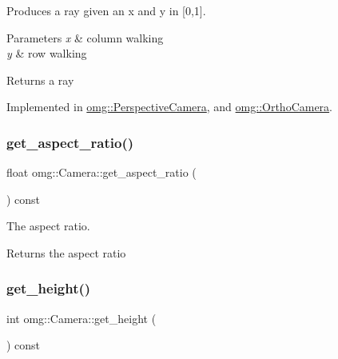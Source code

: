 Produces a ray given an x and y in \mbox{[}0,1\mbox{]}. 


\begin{DoxyParams}{Parameters}
{\em x} & column walking \\
\hline
{\em y} & row walking \\
\hline
\end{DoxyParams}
\begin{DoxyReturn}{Returns}
a ray 
\end{DoxyReturn}


Implemented in \mbox{\hyperlink{classomg_1_1_perspective_camera_a6d849c2b0768f12aed7b50d3ce87afeb}{omg\+::\+Perspective\+Camera}}, and \mbox{\hyperlink{classomg_1_1_ortho_camera_af5dba96ad9cdf91121093d0c9d72e57f}{omg\+::\+Ortho\+Camera}}.

\mbox{\label{classomg_1_1_camera_ad9049467f7a5e4a3a089c789243b1463}} 
\subsubsection{\texorpdfstring{get\_aspect\_ratio()}{get\_aspect\_ratio()}}
{\footnotesize\ttfamily float omg\+::\+Camera\+::get\+\_\+aspect\+\_\+ratio (\begin{DoxyParamCaption}{ }\end{DoxyParamCaption}) const\hspace{0.3cm}{\ttfamily [inline]}}



The aspect ratio. 

\begin{DoxyReturn}{Returns}
the aspect ratio 
\end{DoxyReturn}
\mbox{\label{classomg_1_1_camera_a4003f1cf690980d47b3307e6eefe3003}} 
\subsubsection{\texorpdfstring{get\_height()}{get\_height()}}
{\footnotesize\ttfamily int omg\+::\+Camera\+::get\+\_\+height (\begin{DoxyParamCaption}{ }\end{DoxyParamCaption}) const\hspace{0.3cm}{\ttfamily [inline]}}



